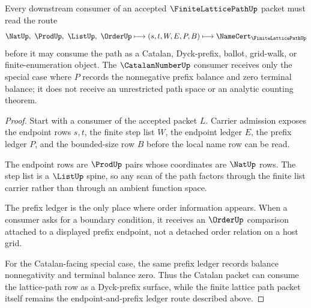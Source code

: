 \begin{theorem}
\label{thm:finite-lattice-path-endpoint-prefix-ledger-route}
Every downstream consumer of an accepted $\FiniteLatticePathUp$ packet must read the route
$$
\NatUp,\ \ProdUp,\ \ListUp,\ \OrderUp
\longmapsto
(s,t,W,E,P,B)
\longmapsto
\NameCert_{\FiniteLatticePathUp}
$$
before it may consume the path as a Catalan, Dyck-prefix, ballot, grid-walk, or finite-enumeration object. The $\CatalanNumberUp$ consumer receives only the special case where $P$ records the nonnegative prefix balance and zero terminal balance; it does not receive an unrestricted path space or an analytic counting theorem.
\end{theorem}
\begin{proof}
Start with a consumer of the accepted packet $L$. Carrier admission exposes the endpoint rows $s,t$, the finite step list $W$, the endpoint ledger $E$, the prefix ledger $P$, and the bounded-size row $B$ before the local name row can be read.

The endpoint rows are $\ProdUp$ pairs whose coordinates are $\NatUp$ rows. The step list is a $\ListUp$ spine, so any scan of the path factors through the finite list carrier rather than through an ambient function space.

The prefix ledger is the only place where order information appears. When a consumer asks for a boundary condition, it receives an $\OrderUp$ comparison attached to a displayed prefix endpoint, not a detached order relation on a host grid.

For the Catalan-facing special case, the same prefix ledger records balance nonnegativity and terminal balance zero. Thus the Catalan packet can consume the lattice-path row as a Dyck-prefix surface, while the finite lattice path packet itself remains the endpoint-and-prefix ledger route described above.
\end{proof}



